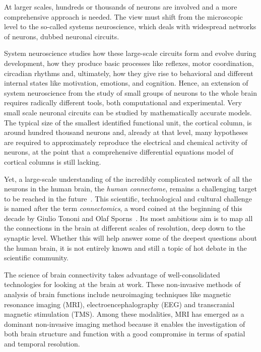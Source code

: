 At larger scales, hundreds or thousands of neurons are involved and a more comprehensive approach is needed.
The view must shift from the microscopic level to the so-called systems neuroscience, which deals with widespread networks of neurons, dubbed neuronal circuits.

System neuroscience studies how these large-scale circuits form and evolve during  development, how they produce basic processes like reflexes, motor coordination, circadian rhythms and, ultimately, how they give rise to behavioral and different internal states like motivation, emotions, and cognition.
Hence, an extension of system neuroscience from the study of small groups of neurons to the whole brain requires radically different tools, both computational and experimental.
Very small scale neuronal circuits can be studied by mathematically accurate models.
The typical size of the smallest identified functional unit, the cortical column, is around hundred thousand neurons and, already at that level, many hypotheses are required to approximately reproduce the electrical and chemical activity of neurons, at the point that a comprehensive differential equations model of cortical columns is still lacking.

Yet, a large-scale understanding of the incredibly complicated network of all the neurons in the human brain, the \emph{human connectome}, remains a challenging target to be reached in the future~\cite{amunts2016}.
This scientific, technological and cultural challenge is named after the term \emph{connectomics}, a word coined at the beginning of this decade by Giulio Tononi and Olaf Sporns~\cite{sporns2005}.
Its most ambitious aim is to map all the connections in the brain at different scales of resolution, deep down to the synaptic level.
Whether this will help answer some of the deepest questions about the human brain, it is not entirely known and still a topic of hot debate in the scientific community.

The science of brain connectivity takes advantage of well-consolidated technologies for looking at the brain at work.
These non-invasive methods of analysis of brain functions include neuroimaging techniques like magnetic resonance imaging (MRI), electroencephalography (EEG) and transcranial magnetic stimulation (TMS).
Among these modalities, MRI has emerged as a dominant non-invasive imaging method because it enables the investigation of both brain structure and function with a good compromise in terms of spatial and temporal resolution.

